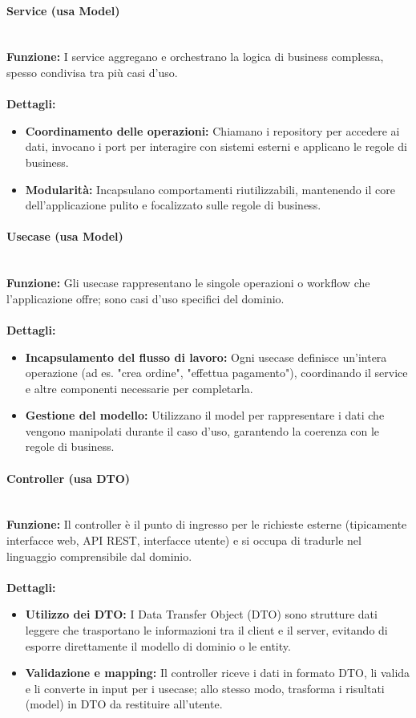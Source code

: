 \paragraph{Service (usa Model)}
\mbox{}\\
\textbf{Funzione:} I service aggregano e orchestrano la logica di business complessa, spesso condivisa tra più casi d’uso. \\
\mbox{}\\
\textbf{Dettagli:}
\begin{itemize}
  \item \textbf{Coordinamento delle operazioni:} Chiamano i repository per accedere ai dati, invocano i port per interagire con sistemi esterni e applicano le regole di business.
  \item \textbf{Modularità:} Incapsulano comportamenti riutilizzabili, mantenendo il core dell’applicazione pulito e focalizzato sulle regole di business.
\end{itemize}

\paragraph{Usecase (usa Model)}
\mbox{}\\
\textbf{Funzione:} Gli usecase rappresentano le singole operazioni o workflow che l’applicazione offre; sono casi d’uso specifici del dominio. \\
\mbox{}\\
\textbf{Dettagli:}
\begin{itemize}
  \item \textbf{Incapsulamento del flusso di lavoro:} Ogni usecase definisce un’intera operazione (ad es. "crea ordine", "effettua pagamento"), coordinando il service e altre componenti necessarie per completarla.
  \item \textbf{Gestione del modello:} Utilizzano il model per rappresentare i dati che vengono manipolati durante il caso d’uso, garantendo la coerenza con le regole di business.
\end{itemize}

\paragraph{Controller (usa DTO)}
\mbox{}\\
\textbf{Funzione:} Il controller è il punto di ingresso per le richieste esterne (tipicamente interfacce web, API REST, interfacce utente) e si occupa di tradurle nel linguaggio comprensibile dal dominio. \\
\mbox{}\\
\textbf{Dettagli:}
\begin{itemize}
  \item \textbf{Utilizzo dei DTO:} I Data Transfer Object (DTO) sono strutture dati leggere che trasportano le informazioni tra il client e il server, evitando di esporre direttamente il modello di dominio o le entity.
  \item \textbf{Validazione e mapping:} Il controller riceve i dati in formato DTO, li valida e li converte in input per i usecase; allo stesso modo, trasforma i risultati (model) in DTO da restituire all’utente.
\end{itemize}

